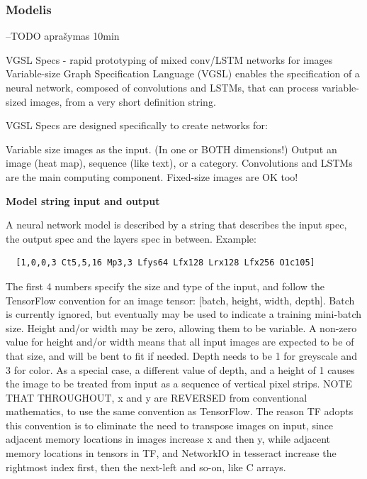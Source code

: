 \documentclass{VUMIFInfBakalaurinis}
\begin{document}
\subsubsection{Modelis}
--TODO
aprašymas 10min


VGSL Specs - rapid prototyping of mixed conv/LSTM networks for images
Variable-size Graph Specification Language (VGSL) enables the specification of a neural network, composed of convolutions and LSTMs, 
that can process variable-sized images, from a very short definition string.


VGSL Specs are designed specifically to create networks for:

Variable size images as the input. (In one or BOTH dimensions!)
Output an image (heat map), sequence (like text), or a category.
Convolutions and LSTMs are the main computing component.
Fixed-size images are OK too!

\textbf{Model string input and output}

A neural network model is described by a string that describes the input spec, the output spec and the layers spec in between. Example:

\begin{verbatim}
  [1,0,0,3 Ct5,5,16 Mp3,3 Lfys64 Lfx128 Lrx128 Lfx256 O1c105]
\end{verbatim}

The first 4 numbers specify the size and type of the input, and follow the TensorFlow convention for an image tensor: [batch, height, width, depth]. 
Batch is currently ignored, but eventually may be used to indicate a training mini-batch size. Height and/or width may be zero, allowing them to be variable. 
A non-zero value for height and/or width means that all input images are expected to be of that size, and will be bent to fit if needed. 
Depth needs to be 1 for greyscale and 3 for color. As a special case, a different value of depth, and a height of 1 causes the image to 
be treated from input as a sequence of vertical pixel strips. NOTE THAT THROUGHOUT, x and y are REVERSED from conventional mathematics, 
to use the same convention as TensorFlow. The reason TF adopts this convention is to eliminate the need to transpose images on input, 
since adjacent memory locations in images increase x and then y, while adjacent memory locations in tensors in TF, and NetworkIO in 
tesseract increase the rightmost index first, then the next-left and so-on, like C arrays.
\end{document}
